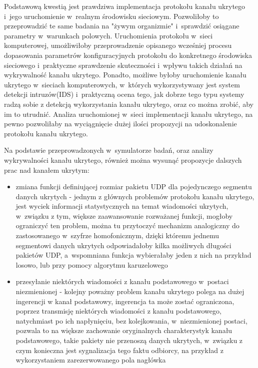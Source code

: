 \documentclass[a4paper, twoside, 12pt]{report}
\begin{document}
    Podstawową kwestią jest prawdziwa implementacja protokołu kanału ukrytego
    i~jego uruchomienie w~realnym środowisku sieciowym. Pozwoliłoby to przeprowadzić
    te same badania na "żywym organizmie" i~sprawdzić osiągane parametry w~warunkach polowych.
    Uruchomienia protokołu w~sieci komputerowej, umożliwiłoby przeprowadzenie opisanego
    wcześniej procesu dopasowania parametrów konfiguracyjnych protokołu do konkretnego
    środowiska sieciowego i~praktyczne sprawdzenie skuteczności i~wpływu takich
    działań na wykrywalność kanału ukrytego. Ponadto, możliwe byłoby uruchomienie
    kanału ukrytego w~sieciach komputerowych, w~których wykorzystywany jest system
    detekcji intruzów(IDS) i~praktyczną ocena tego, jak dobrze tego typu systemy
    radzą sobie z detekcją wykorzystania kanału ukrytego, oraz co można zrobić,
    aby im to utrudnić. Analiza uruchomionej w~sieci implementacji kanału ukrytego,
    na pewno pozwoliłaby na wyciągnięcie dużej ilości propozycji na udoskonalenie
    protokołu kanału ukrytego.

    Na podstawie przeprowadzonych w~symulatorze badań, oraz analizy wykrywalności
    kanału ukrytego, również można wysunąć propozycje dalszych prac nad kanałem ukrytym:

    \begin{itemize}
        \item zmiana funkcji definiującej rozmiar pakietu UDP dla pojedynczego segmentu danych ukrytych -
            jednym z głównych problemów protokołu kanału ukrytego, jest wyciek
            informacji statystycznych na temat wiadomości ukrytych, w~związku z tym,
            większe zaawansowanie rozważanej funkcji, mogłoby ograniczyć ten problem,
            można tu przytoczyć mechanizm analogiczny do zastosowanego w~szyfrze
            homofonicznym, dzięki któremu jednemu segmentowi danych ukrytych
            odpowiadałoby kilka możliwych długości pakietów UDP, a~wspomniana funkcja
            wybierałaby jeden z nich na przykład losowo, lub przy pomocy algorytmu
            karuzelowego
        \item przesyłanie niektórych wiadomości z kanału podstawowego w~postaci niezmienionej -
            kolejny poważny problem kanału ukrytego polega na dużej ingerencji w
            kanał podstawowy, ingerencja ta może zostać ograniczona, poprzez
            transmisję niektórych wiadomości z kanału podstawowego, natychmiast
            po ich napłynięciu, bez kolejkowania, w~niezmienionej postaci,
            pozwala to na większe zachowanie oryginalnych charakterystyk kanału
            podstawowego, takie pakiety nie przenoszą danych ukrytych, w~związku
            z czym konieczna jest sygnalizacja tego faktu odbiorcy, na przykład
            z wykorzystaniem zarezerwowanego pola nagłówka
    \end{itemize}

\clearpage
{}


\end{document}
